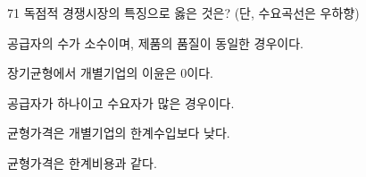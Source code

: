 \begin{question}{71}
독점적 경쟁시장의 특징으로 옳은 것은? (단, 수요곡선은 우하향)
\begin{choices}
  \item 공급자의 수가 소수이며, 제품의 품질이 동일한 경우이다.
  \item 장기균형에서 개별기업의 이윤은 0이다.
  \item 공급자가 하나이고 수요자가 많은 경우이다.
  \item 균형가격은 개별기업의 한계수입보다 낮다.
  \item 균형가격은 한계비용과 같다.
\end{choices}
\end{question}
